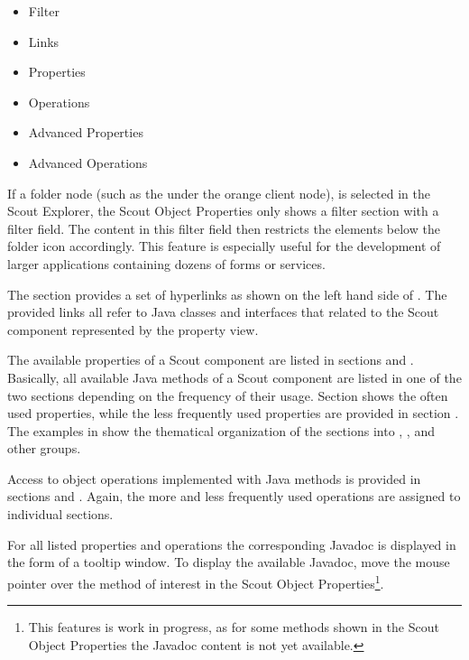 \documentclass[a4paper,10pt,twoside]{book}
\begin{document}
\begin{itemize}
  \item Filter
  \item Links
  \item Properties
  \item Operations
  \item Advanced Properties
  \item Advanced Operations
\end{itemize}

If a folder node (such as the  under the orange client node), is selected in the Scout Explorer, the Scout Object Properties only shows a filter section with a filter field. 
The content in this filter field then restricts the elements below the folder icon accordingly. 
This feature is especially useful for the development of larger applications containing dozens of forms or services. 

The  section provides a set of hyperlinks as shown on the left hand side of . 
The provided links all refer to Java classes and interfaces that related to the Scout component represented by the property view. 

The available properties of a Scout component are listed in sections  and . 
Basically, all available Java  methods of a Scout component are listed in one of the two sections depending on the frequency of their usage. 
Section  shows the often used properties, while the less frequently used properties are provided in section . 
The examples in  show the thematical organization of the sections into , ,  and other groups.

Access to object operations implemented with Java  methods is provided in sections  and . 
Again, the more and less frequently used operations are assigned to individual sections. 

For all listed properties and operations the corresponding Javadoc is displayed in the form of a tooltip window. 
To display the available Javadoc, move the mouse pointer over the method of interest in the Scout Object Properties\footnote{
This features is work in progress, as for some methods shown in the Scout Object Properties the Javadoc content is not yet available. 
}. 
\end{document}
